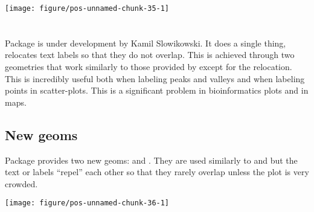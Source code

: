 \documentclass[paper=a4,10pt,div=17,headsepline,BCOR=12mm,twoside,open=right]{scrbook}\usepackage{knitr}
\begin{document}
\begin{knitrout}\footnotesize
{}\color{fgcolor}\begin{kframe}
\begin{alltt}
\hlopt{$} \hlkwb{<-} \hlopt{$} \hlopt{>=} \hlstd{,} \hlstd{,} \hlstd{)}
    \hlopt{+}
  \hlstd{()} \hlopt{+}
  \hlstd{(} \hlstd{=} \hlstd{,}  \hlstd{=} \hlstd{(}\hlstd{))}
\end{alltt}
\end{kframe}

{\centering \texttt{[image: figure/pos-unnamed-chunk-35-1]} 

}



\end{knitrout}

\section[ggrepel]{\ggrepel}

Package \ggrepel is under development by Kamil Slowikowski. It does a single
thing, relocates text labels so that they do not overlap. This is achieved through
two geometries that work similarly to those provided by \ggplot except for the
relocation. This is incredibly useful both when labeling peaks and valleys and when
labeling points in scatter-plots. This is a significant problem in bioinformatics
plots and in maps.

\subsection{New geoms}

Package \ggrepel provides two new geoms:  and . They are used similarly to  and  but the text or labels ``repel'' each other so that they rarely overlap unless the plot is very crowded.

\begin{knitrout}\footnotesize
{}\color{fgcolor}\begin{kframe}
\begin{alltt}
  \hlopt{+}
  \hlstd{()} \hlopt{+}
  \hlstd{(} \hlstd{=} \hlstd{,}  \hlstd{=} \hlstd{)}
\end{alltt}
\end{kframe}

{\centering \texttt{[image: figure/pos-unnamed-chunk-36-1]} 

}



\end{knitrout}
\end{document}
